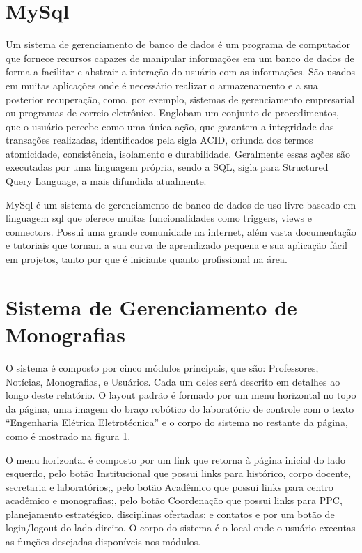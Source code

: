\documentclass[
	12pt,				%
	openright,			%
	twoside,			%
	a4paper,			%
	english,			%
	french,				%
	spanish,			%
	brazil,				%
	]{abntex2}
\begin{document}
\section{MySql}

Um sistema de gerenciamento de banco de dados é um programa de computador que fornece recursos capazes de manipular informações em um banco de dados de forma a facilitar e abstrair a interação do usuário com as informações. São usados em muitas aplicações onde é necessário realizar o armazenamento e a sua posterior recuperação, como, por exemplo, sistemas de gerenciamento empresarial ou programas de correio eletrônico. Englobam um conjunto de procedimentos, que o usuário percebe como uma única ação, que garantem a integridade das transações realizadas, identificados pela sigla ACID, oriunda dos termos atomicidade, consistência, isolamento e durabilidade. Geralmente essas ações são executadas por uma linguagem própria, sendo a SQL, sigla para Structured Query Language, a mais difundida atualmente.

MySql é um sistema de gerenciamento de banco de dados de uso livre baseado em linguagem sql que oferece muitas funcionalidades como triggers, views e connectors. Possui uma grande comunidade na internet, além vasta documentação e tutoriais que tornam a sua curva de aprendizado pequena e sua aplicação fácil em projetos, tanto por que é iniciante quanto profissional na área.

\section{Sistema de Gerenciamento de Monografias}

O sistema é composto por cinco módulos principais, que são: Professores, Notícias, Monografias, e Usuários. Cada um deles será descrito em detalhes ao longo deste relatório. O layout padrão é formado por um menu horizontal no topo da página, uma imagem do braço robótico do laboratório de controle com o texto “Engenharia Elétrica Eletrotécnica” e o corpo do sistema no restante da página, como é mostrado na figura 1.

O menu horizontal é composto por um link que retorna à página inicial do lado esquerdo, pelo botão Institucional que possui links para histórico, corpo docente, secretaria e laboratórios;, pelo botão Acadêmico que possui links para centro acadêmico e monografias;, pelo botão Coordenação que possui links para PPC, planejamento estratégico, disciplinas ofertadas; e contatos e por um botão de login/logout do lado direito. O corpo do sistema é o local onde o usuário executas as funções desejadas disponíveis nos módulos.
\end{document}
